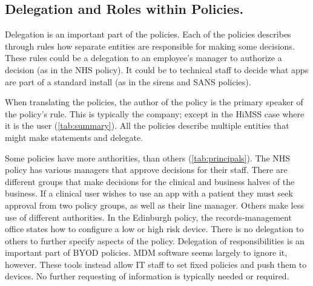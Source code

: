 \documentclass[thesis.tex]{subfiles}
\begin{document}
\subsection{Delegation and Roles within Policies.}

Delegation is an important part of the policies.
Each of the policies describes through rules how separate entities are responsible for making some decisions.
These rules could be a delegation to an employee's manager to authorize a decision (as in the NHS policy).
It could be to technical staff to decide what apps are part of a standard install (as in the sirens and SANS policies).

When translating the policies, the author of the policy is the primary speaker of the policy's rule.
This is typically the company; except in the \ac{HiMSS} case where it is the user (\autoref{tab:summary}).
All the policies describe multiple entities that might make statements and delegate.

Some policies have more authorities, than others (\autoref{tab:principals}).
The NHS policy has various managers that approve decisions for their staff.
There are different groups that make decisions for the clinical and business halves of the business.
If a clinical user wishes to use an app with a patient they must seek approval from two policy groups, as well as their line manager.
Others make less use of different authorities.
In the Edinburgh policy, the records-management office states how to configure a low or high risk device.
There is no delegation to others to further specify aspects of the policy.
Delegation of responsibilities is an important part of BYOD policies.
MDM software seems largely to ignore it, however.
These tools instead allow IT staff to set fixed policies and push them to devices.
No further requesting of information is typically needed or required.
\end{document}
